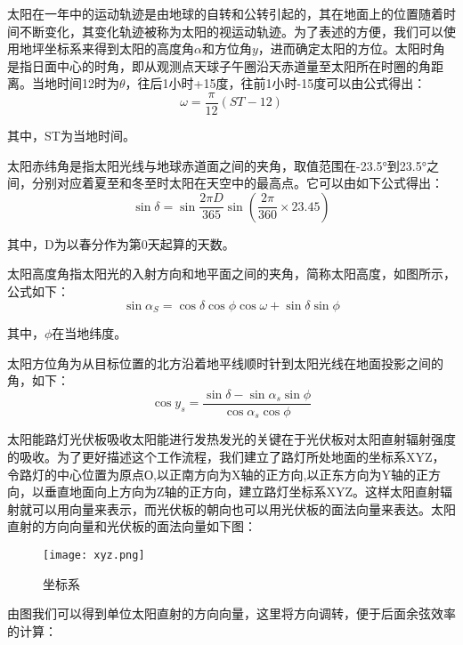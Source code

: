 \documentclass[withoutpreface,bwprint]{cumcmthesis} %
\begin{document}
太阳在一年中的运动轨迹是由地球的自转和公转引起的，其在地面上的位置随着时间不断变化，其变化轨迹被称为太阳的视运动轨迹。为了表述的方便，我们可以使用地坪坐标系来得到太阳的高度角$\alpha$和方位角$y$，进而确定太阳的方位。太阳时角是指日面中心的时角，即从观测点天球子午圈沿天赤道量至太阳所在时圈的角距离。当地时间12时为$\theta$，往后1小时+15度，往前1小时-15度可以由公式得出：
\begin{equation}
	\omega = \frac{\pi}{12}(ST - 12)
	\label{eq:002}
\end{equation}

其中，ST为当地时间。

太阳赤纬角是指太阳光线与地球赤道面之间的夹角，取值范围在-23.5°到23.5°之间，分别对应着夏至和冬至时太阳在天空中的最高点。它可以由如下公式得出：
\begin{equation}
	\sin\delta = \sin \frac{{2}\pi D}{365}\sin\left(\frac{2\pi}{360} \times 23.45\right)
	\label{eq:003}
\end{equation}

其中，D为以春分作为第0天起算的天数。

太阳高度角指太阳光的入射方向和地平面之间的夹角，简称太阳高度，如图所示，公式如下：
\begin{equation}
	\sin\alpha_{S} = \cos \delta \cos \phi \cos \omega + \sin \delta \sin \phi
	\label{eq:004}
\end{equation}

其中，$\phi$在当地纬度。

太阳方位角为从目标位置的北方沿着地平线顺时针到太阳光线在地面投影之间的角，如下：
\begin{equation}
	\cos y_{s} = \frac{ \sin \delta - \sin \alpha_{s} \sin \phi}{\cos \alpha_{s}\cos \phi}
	\label{eq:004}
\end{equation}

太阳能路灯光伏板吸收太阳能进行发热发光的关键在于光伏板对太阳直射辐射强度的吸收。为了更好描述这个工作流程，我们建立了路灯所处地面的坐标系XYZ，令路灯的中心位置为原点О,以正南方向为X轴的正方向,以正东方向为Y轴的正方向，以垂直地面向上方向为Z轴的正方向，建立路灯坐标系XYZ。这样太阳直射辐射就可以用向量来表示，而光伏板的朝向也可以用光伏板的面法向量来表达。太阳直射的方向向量和光伏板的面法向量如下图：

\begin{figure}[!h]
	\centering
	\texttt{[image: xyz.png]}
	\caption{坐标系}
	\label{fig:002}
\end{figure}

由图我们可以得到单位太阳直射的方向向量，这里将方向调转，便于后面余弦效率的计算：
\end{document}
